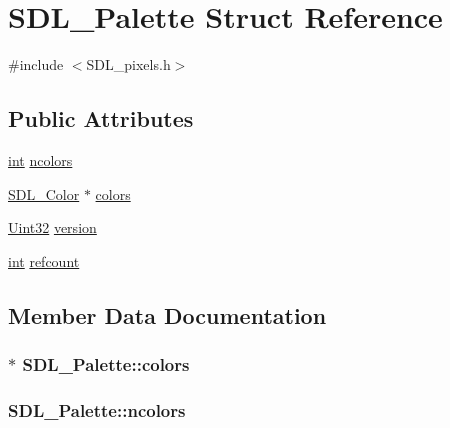 \hypertarget{struct_s_d_l___palette}{}\section{S\+D\+L\+\_\+\+Palette Struct Reference}
\label{struct_s_d_l___palette}


{\ttfamily \#include $<$S\+D\+L\+\_\+pixels.\+h$>$}

\subsection*{Public Attributes}
\begin{DoxyCompactItemize}
\item 
\hyperlink{_s_d_l__thread_8h_a6a64f9be4433e4de6e2f2f548cf3c08e}{int} \hyperlink{struct_s_d_l___palette_a81a0cc3197480e994c6b06f1f0567091}{ncolors}
\item 
\hyperlink{struct_s_d_l___color}{S\+D\+L\+\_\+\+Color} $\ast$ \hyperlink{struct_s_d_l___palette_ad757a50037f43533196e94942440b241}{colors}
\item 
\hyperlink{_s_d_l__stdinc_8h_add440eff171ea5f55cb00c4a9ab8672d}{Uint32} \hyperlink{struct_s_d_l___palette_a5b8d45519f6850a32f13f1602ce37a8e}{version}
\item 
\hyperlink{_s_d_l__thread_8h_a6a64f9be4433e4de6e2f2f548cf3c08e}{int} \hyperlink{struct_s_d_l___palette_a35c667737f883f973bb0a8dea143b08d}{refcount}
\end{DoxyCompactItemize}


\subsection{Member Data Documentation}
\subsubsection[{\texorpdfstring{colors}{colors}}]{$\ast$ S\+D\+L\+\_\+\+Palette\+::colors}\hypertarget{struct_s_d_l___palette_ad757a50037f43533196e94942440b241}{}\label{struct_s_d_l___palette_ad757a50037f43533196e94942440b241}
\subsubsection[{\texorpdfstring{ncolors}{ncolors}}]{ S\+D\+L\+\_\+\+Palette\+::ncolors}\hypertarget{struct_s_d_l___palette_a81a0cc3197480e994c6b06f1f0567091}{}\label{struct_s_d_l___palette_a81a0cc3197480e994c6b06f1f0567091}
